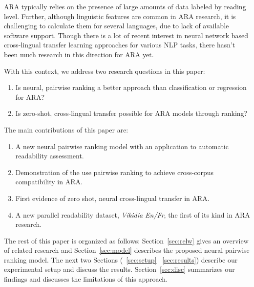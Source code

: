 \documentclass[11pt]{article}
\begin{document}
ARA typically relies on the presence of large amounts of data labeled by reading level. Further, although linguistic features are common in ARA research, it is challenging to calculate them for several languages, due to lack of available software support. Though there is a lot of recent interest in neural network based cross-lingual transfer learning approaches for various NLP tasks, there hasn't been much research in this direction for ARA yet. 

With this context, we address two research questions in this paper:
\begin{enumerate}\itemsep-1mm
 \item Is neural, pairwise ranking a better approach than classification or regression for ARA?
    \item Is zero-shot, cross-lingual transfer possible for ARA models through ranking? 
\end{enumerate}

The main contributions of this paper are:
\begin{enumerate}\itemsep-1mm
    \item A new neural pairwise ranking model with an application to automatic readability assessment.
    \item Demonstration of the use pairwise ranking to achieve cross-corpus compatibility in ARA.
    \item First evidence of zero shot, neural cross-lingual transfer in ARA.
    \item A new parallel readability dataset, \textit{Vikidia En/Fr}, the first of its kind in ARA research. 
\end{enumerate}

The rest of this paper is organized as follows: Section~\ref{sec:relw} gives an overview of related research and Section~\ref{sec:model} describes the proposed neural pairwise ranking model. The next two Sections (~\ref{sec:setup} ~\ref{sec:results}) describe our experimental setup and discuss the results. Section~\ref{sec:disc} summarizes our findings and discusses the limitations of this approach. 
\end{document}
